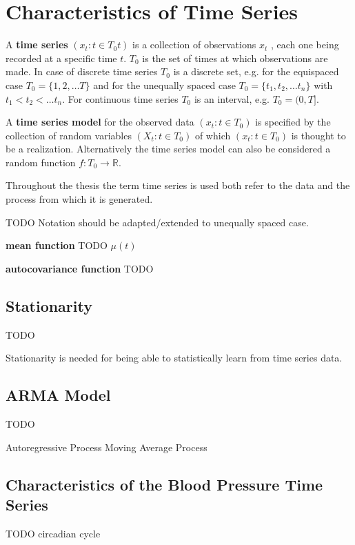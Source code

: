 

\chapter{Characteristics of Time Series}

A \textbf{time series} $(x_t: t \in T_0t)$ is a collection of observations $x_t$ ,
each one being recorded at a specific time $t$. $T_0$ is the set of times at which observations are made.
In case of discrete time series $T_0$ is a discrete set, e.g. for the equispaced case $T_0 = \{1, 2, \dots T\}$ and
for the unequally spaced case $T_0 = \{t_1, t_2, \dots t_n\}$ with $t_1 < t_2 < \dots t_n$.
For continuous time series $T_0$ is an interval, e.g. $T_0 = (0, T]$.

A \textbf{time series model} for the observed data $(x_t: t \in T_0)$ is specified by the collection of random variables
$(X_t: t \in T_0)$ of which $(x_t: t \in T_0)$ is thought to be a realization.
Alternatively the time series model can also be considered a random function $f: T_0 \to \mathbb{R}$.

Throughout the thesis the term time series is used both refer to the data and the process from which it is generated.

\citeauthor{brockwell_introduction_2016}


TODO Notation should be adapted/extended to unequally spaced case.


\textbf{mean function}
TODO
$\mu(t)$


\textbf{autocovariance function}
TODO

\section{Stationarity}
TODO

Stationarity is needed for being able to statistically learn from time series data.



\section{ARMA Model}
TODO


Autoregressive Process
Moving Average Process



\section{Characteristics of the Blood Pressure Time Series}
TODO
circadian cycle


